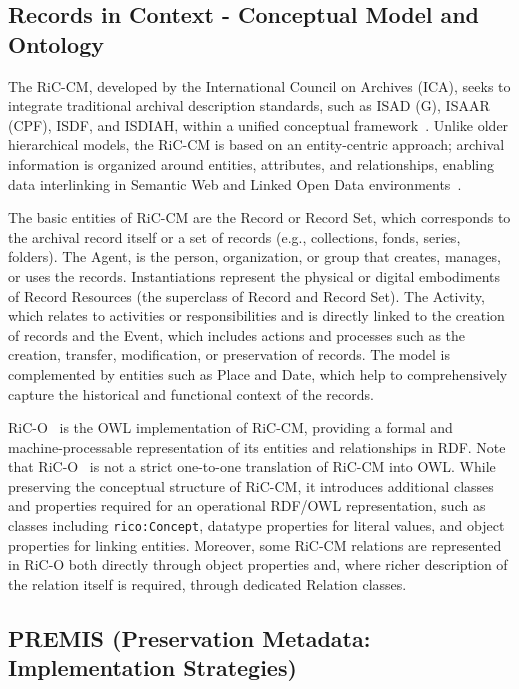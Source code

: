 \documentclass[runningheads]{llncs}
\begin{document}
\subsection{Records in Context - Conceptual Model and Ontology}
The RiC-CM, developed by the International Council on Archives (ICA), seeks to integrate traditional archival description standards, such as ISAD (G), ISAAR (CPF), ISDF, and ISDIAH, within a unified conceptual framework~\cite{RICCM}. Unlike older hierarchical models, the RiC-CM is based on an entity-centric approach; archival information is organized around entities, attributes, and relationships, enabling data interlinking in Semantic Web and Linked Open Data environments~\cite{RICCM}.  

The basic entities of RiC-CM are the Record or Record Set, which corresponds to the archival record itself or a set of records (e.g., collections, fonds, series, folders). The Agent, is the person, organization, or group that creates, manages, or uses the records. Instantiations represent the physical or digital embodiments of Record Resources (the superclass of Record and Record Set). The Activity, which relates to activities or responsibilities and is directly linked to the creation of records and the Event, which includes actions and processes such as the creation, transfer, modification, or preservation of records. The model is complemented by entities such as Place and Date, which help to comprehensively capture the historical and functional context of the records. 

RiC-O~\cite{RiCO} is the OWL implementation of RiC-CM, providing a formal and machine-processable representation of its entities and relationships in RDF. 
Note that RiC-O~\cite{RiCO} is not a strict one-to-one translation of RiC-CM into OWL. While preserving the conceptual structure of RiC-CM, it introduces additional classes and properties required for an operational RDF/OWL representation, such as classes including \texttt{rico:Concept}, datatype properties for literal values, and object properties for linking entities. Moreover, some RiC-CM relations are represented in RiC-O both directly through object properties and, where richer description of the relation itself is required, through dedicated Relation classes.


\subsection{PREMIS (Preservation Metadata: Implementation Strategies)}
\end{document}
